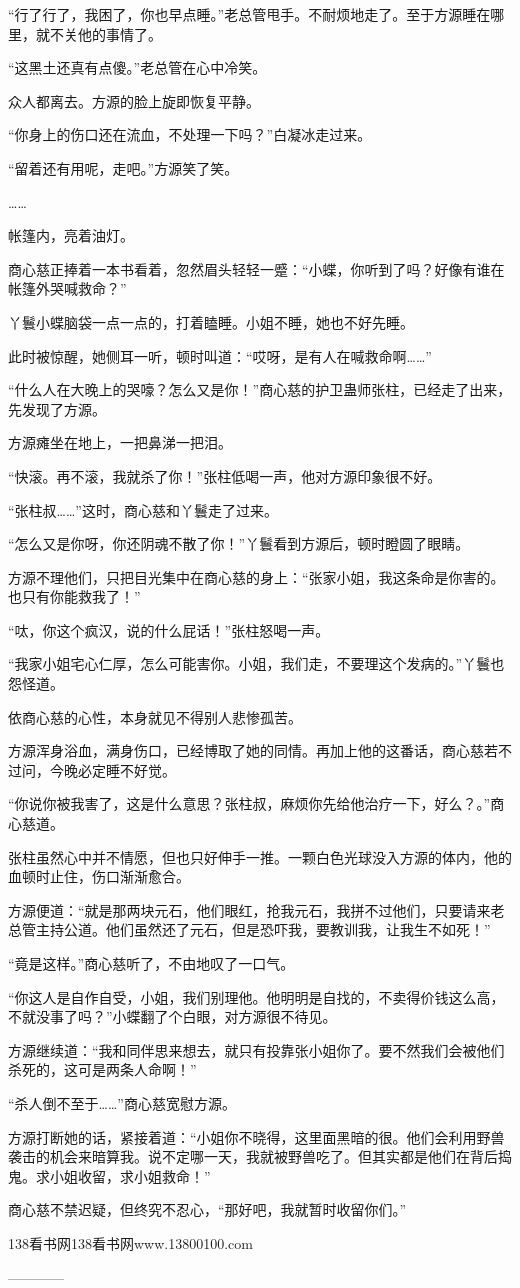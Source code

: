 \begin{this_body}
“行了行了，我困了，你也早点睡。”老总管甩手。不耐烦地走了。至于方源睡在哪里，就不关他的事情了。

“这黑土还真有点傻。”老总管在心中冷笑。

众人都离去。方源的脸上旋即恢复平静。

“你身上的伤口还在流血，不处理一下吗？”白凝冰走过来。

“留着还有用呢，走吧。”方源笑了笑。

……

帐篷内，亮着油灯。

商心慈正捧着一本书看着，忽然眉头轻轻一蹙：“小蝶，你听到了吗？好像有谁在帐篷外哭喊救命？”

丫鬟小蝶脑袋一点一点的，打着瞌睡。小姐不睡，她也不好先睡。

此时被惊醒，她侧耳一听，顿时叫道：“哎呀，是有人在喊救命啊……”

“什么人在大晚上的哭嚎？怎么又是你！”商心慈的护卫蛊师张柱，已经走了出来，先发现了方源。

方源瘫坐在地上，一把鼻涕一把泪。

“快滚。再不滚，我就杀了你！”张柱低喝一声，他对方源印象很不好。

“张柱叔……”这时，商心慈和丫鬟走了过来。

“怎么又是你呀，你还阴魂不散了你！”丫鬟看到方源后，顿时瞪圆了眼睛。

方源不理他们，只把目光集中在商心慈的身上：“张家小姐，我这条命是你害的。也只有你能救我了！”

“呔，你这个疯汉，说的什么屁话！”张柱怒喝一声。

“我家小姐宅心仁厚，怎么可能害你。小姐，我们走，不要理这个发病的。”丫鬟也怨怪道。

依商心慈的心性，本身就见不得别人悲惨孤苦。

方源浑身浴血，满身伤口，已经博取了她的同情。再加上他的这番话，商心慈若不过问，今晚必定睡不好觉。

“你说你被我害了，这是什么意思？张柱叔，麻烦你先给他治疗一下，好么？。”商心慈道。

张柱虽然心中并不情愿，但也只好伸手一推。一颗白色光球没入方源的体内，他的血顿时止住，伤口渐渐愈合。

方源便道：“就是那两块元石，他们眼红，抢我元石，我拼不过他们，只要请来老总管主持公道。他们虽然还了元石，但是恐吓我，要教训我，让我生不如死！”

“竟是这样。”商心慈听了，不由地叹了一口气。

“你这人是自作自受，小姐，我们别理他。他明明是自找的，不卖得价钱这么高，不就没事了吗？”小蝶翻了个白眼，对方源很不待见。

方源继续道：“我和同伴思来想去，就只有投靠张小姐你了。要不然我们会被他们杀死的，这可是两条人命啊！”

“杀人倒不至于……”商心慈宽慰方源。

方源打断她的话，紧接着道：“小姐你不晓得，这里面黑暗的很。他们会利用野兽袭击的机会来暗算我。说不定哪一天，我就被野兽吃了。但其实都是他们在背后捣鬼。求小姐收留，求小姐救命！”

商心慈不禁迟疑，但终究不忍心，“那好吧，我就暂时收留你们。”

138看书网138看书网www.13800100.com

------------

\end{this_body}

